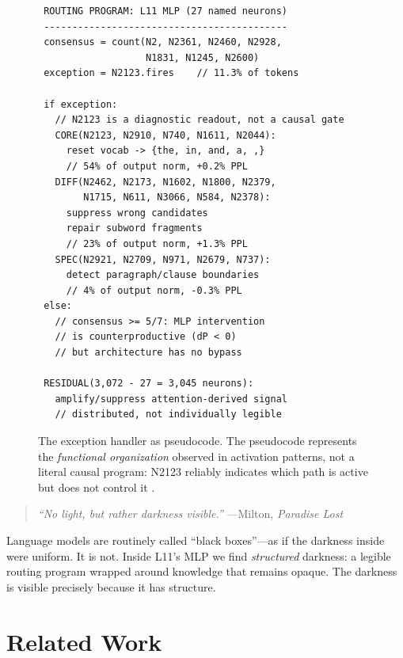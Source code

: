 \documentclass{article}
\begin{document}
\begin{figure}[t]
\centering
\small
\begin{verbatim}
 ROUTING PROGRAM: L11 MLP (27 named neurons)
 -------------------------------------------
 consensus = count(N2, N2361, N2460, N2928,
                   N1831, N1245, N2600)
 exception = N2123.fires    // 11.3% of tokens

 if exception:
   // N2123 is a diagnostic readout, not a causal gate
   CORE(N2123, N2910, N740, N1611, N2044):
     reset vocab -> {the, in, and, a, ,}
     // 54% of output norm, +0.2% PPL
   DIFF(N2462, N2173, N1602, N1800, N2379,
        N1715, N611, N3066, N584, N2378):
     suppress wrong candidates
     repair subword fragments
     // 23% of output norm, +1.3% PPL
   SPEC(N2921, N2709, N971, N2679, N737):
     detect paragraph/clause boundaries
     // 4% of output norm, -0.3% PPL
 else:
   // consensus >= 5/7: MLP intervention
   // is counterproductive (dP < 0)
   // but architecture has no bypass

 RESIDUAL(3,072 - 27 = 3,045 neurons):
   amplify/suppress attention-derived signal
   // distributed, not individually legible
\end{verbatim}
\caption{The exception handler as pseudocode. The pseudocode represents the
\emph{functional organization} observed in activation patterns, not a literal
causal program: N2123 reliably indicates which path is active but does not
control it \citep{balogh2026discrete}.}
\label{fig:pseudocode}
\end{figure}

\begin{quote}
\emph{``No light, but rather darkness visible.''}
\hfill ---Milton, \emph{Paradise Lost}
\end{quote}

\noindent Language models are routinely called ``black boxes''---as if the darkness
inside were uniform.
It is not.
Inside L11's MLP we find \emph{structured} darkness: a legible routing
program wrapped around knowledge that remains opaque.
The darkness is visible precisely because it has structure.

\section{Related Work}
\end{document}

